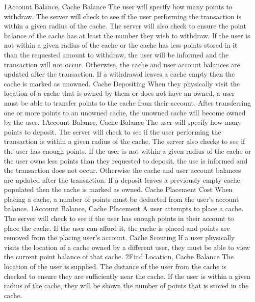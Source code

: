 			{1}{Account Balance, Cache Balance}
			{The user will specify how many points to withdraw.}
			{The server will check to see if the user performing the 
			transaction is within a given radius of the cache. The server will
			also check to ensure the point balance of the cache has at least
			the number they wish to withdraw.}
			{If the user is not within a given radius of the cache or the cache
			has less points stored in it than the requested amount to withdraw,
			the user will be informed and the transaction will not occur. 
			Otherwise, the cache and user account balances are
			updated after the transaction. If a withdrawal leaves a cache empty
			then the cache is marked as unowned.}
		\funcreq
			{Cache Depositing}
			{When they physically visit the location of a cache that is owned
			by them or does not have an owned, a user must be able to transfer 
			points to the cache from their account. After transferring one or 
			more points to an unowned cache, the unowned cache will become
			owned by the user.}
		    {1}{Account Balance, Cache Balance}
			{The user will specify how many points to deposit.}
			{The server will check to see if the user performing the 
			transaction is within a given radius of the cache. The server also
			checks to see if the user has enough points.}
			{If the user is not within a given radius of the cache or the user
			owns less points than they requested to deposit, the
			use is informed and the transaction does not occur. Otherwise the
			cache and user account balances are updated after the transaction.
			If a deposit leaves a previously empty cache populated then the
			cache is marked as owned.}
		\funcreq
			{Cache Placement Cost}
			{When placing a cache, a number of points must be deducted from the
			user's account balance.}
			{1}{Account Balance, Cache Placement}
			{A user attempts to place a cache.}
			{The server will check to see if the user has enough points in
			their account to place the cache.}
			{If the user can afford it, the cache is placed and points are 
			removed from the placing user's account.}
		\funcreq
			{Cache Scouting}
			{If a user physically visits the location of a cache owned by a 
			different user, they must be able to view the current point balance 
            of that cache.}
			{2}{Find Location, Cache Balance}
			{The location of the user is supplied.}
			{The distance of the user from the cache is checked to ensure they 
			are sufficiently near the cache.}
			{If the user is within a given radius of the cache, they will be 
			shown the number of points that is stored in the cache.}
